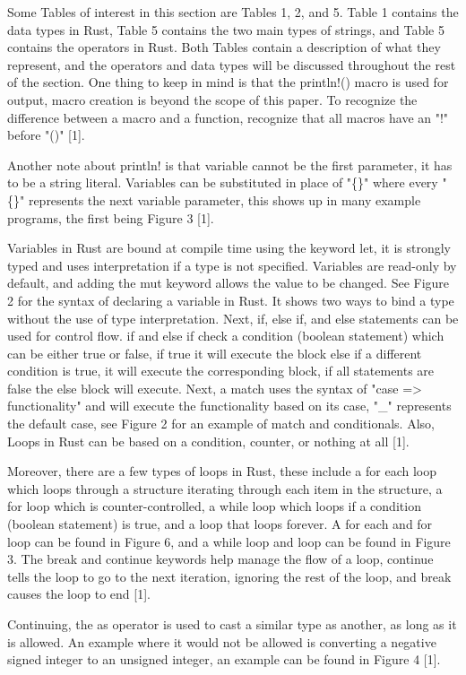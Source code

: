 \documentclass[sigconf,authorversion,nonacm]{acmart}
\begin{document}
Some Tables of interest in this section are Tables 1, 2, and 5. Table 1 contains the data types in Rust, Table 5 contains the two main types of strings, and Table 5 contains the operators in Rust. Both Tables contain a description of what they represent, and the operators and data types will be discussed throughout the rest of the section. One thing to keep in mind is that the println!() macro is used for output, macro creation is beyond the scope of this paper. To recognize the difference between a macro and a function, recognize that all macros have an "!" before "()" [1].

Another note about println! is that variable cannot be the first parameter, it has to be a string literal. Variables can be substituted in place of "\{\}" where every "\{\}" represents the next variable parameter, this shows up in many example programs, the first being Figure 3 [1].  

Variables in Rust are bound at compile time using the keyword let, it is strongly typed and uses interpretation if a type is not specified. Variables are read-only by default, and adding the mut keyword allows the value to be changed. See Figure 2 for the syntax of declaring a variable in Rust. It shows two ways to bind a type without the use of type interpretation. Next, if, else if, and else statements can be used for control flow. if and else if check a condition (boolean statement) which can be either true or false, if true it will execute the block else if a different condition is true, it will execute the corresponding block, if all statements are false the else block will execute. Next, a match uses the syntax of "case => functionality" and will execute the functionality based on its case, "\_" represents the default case, see Figure 2 for an example of match and conditionals. Also, Loops in Rust can be based on a condition, counter, or nothing at all [1]. 

Moreover, there are a few types of loops in Rust, these include a for each loop which loops through a structure iterating through each item in the structure, a for loop which is counter-controlled, a while loop which loops if a condition (boolean statement) is true, and a loop that loops forever. A for each and for loop can be found in Figure 6, and a while loop and loop can be found in Figure 3. The break and continue keywords help manage the flow of a loop, continue tells the loop to go to the next iteration, ignoring the rest of the loop, and break causes the loop to end [1].

Continuing, the as operator is used to cast a similar type as another, as long as it is allowed. An example where it would not be allowed is converting a negative signed integer to an unsigned integer, an example can be found in Figure 4 [1].
\end{document}
